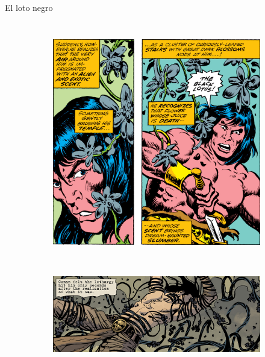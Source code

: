 \begin{frame}{El loto negro}
\begin{columns}
\begin{figure}[htp]
\begin{subfigure}[b]{0.27\textwidth}
				\includegraphics[width=\textwidth]{img/loto/CTB}
			\end{subfigure}
			\\
			\begin{subfigure}[b]{0.6\textwidth}
				\includegraphics[width=\textwidth]{img/loto/DH}
			\end{subfigure}
		\end{figure}
	\end{columns}
\end{frame}
\note[itemize]{
	\item
}

